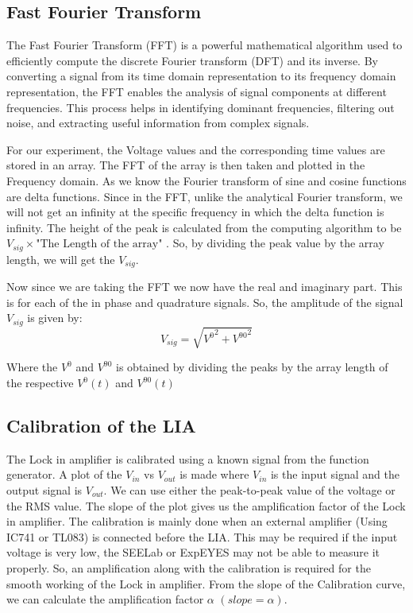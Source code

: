 \documentclass{article}
\begin{document}
\begin{multicols}{2}

\subsection{Fast Fourier Transform}


The Fast Fourier Transform (FFT) is a powerful mathematical algorithm used to efficiently compute the discrete Fourier transform (DFT) and its inverse. By converting a signal from its time domain representation to its frequency domain representation, the FFT enables the analysis of signal components at different frequencies. This process helps in identifying dominant frequencies, filtering out noise, and extracting useful information from complex signals.



For our experiment, the Voltage values and the corresponding time values are stored in an array. The FFT of the array is then taken and plotted in the Frequency domain. As we know the Fourier transform of sine and cosine functions are delta functions. Since in the FFT, unlike the analytical Fourier transform, we will not get an infinity at the specific frequency in which the delta function is infinity. The height of the peak is calculated from the computing algorithm to be $V_{sig} \times \text{"The Length of the array"}$ . So, by dividing the peak value by the array length, we will get the $V_{sig}$.  


Now since we are taking the FFT we now have the real and imaginary part. This is for each of the in phase and quadrature signals. So, the amplitude of the signal $V_{sig}$ is given by:
\begin{equation}
    V_{sig} = \sqrt{{V^0}^2 + {V^{90}}^2}
\end{equation}

Where the $V^0$ and $V^{90}$ is obtained by dividing the peaks by the array length of the respective $V^0 (t)$  and $V^{90} (t)$



\subsection{Calibration of the LIA}
The Lock in amplifier is calibrated using a known signal from the function generator. A plot of the $V_{in}$  vs $V_{out}$ is made where $V_{in}$ is the input signal and the output signal is $V_{out}$. We can use either the peak-to-peak value of the voltage or the RMS value. The slope of the plot gives us the amplification factor of the Lock in amplifier. The calibration is mainly done when an external amplifier (Using IC741 or TL083) is connected before the LIA. This may be required if the input voltage is very low, the SEELab or ExpEYES may not be able to measure it properly. So, an amplification along with the calibration is required for the smooth working of the Lock in amplifier. From the slope of the Calibration curve, we can calculate the amplification factor $\alpha$ $(slope= \alpha)$.

\end{multicols}
\end{document}
